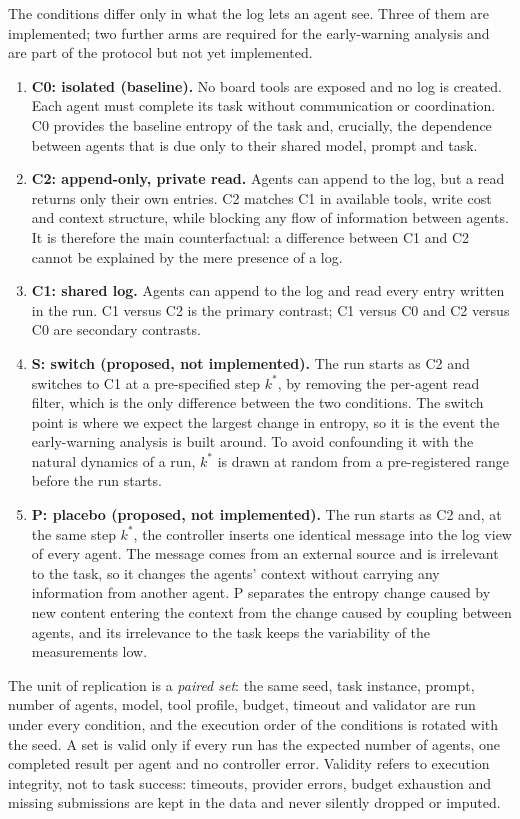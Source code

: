 The conditions differ only in what the log lets an agent see. Three of them are implemented; two further arms are required for the early-warning analysis and are part of the protocol but not yet implemented.
\begin{enumerate}
  \item \textbf{C0: isolated (baseline).} No board tools are exposed and no log is created. Each agent must complete its task without communication or coordination. C0 provides the baseline entropy of the task and, crucially, the dependence between agents that is due only to their shared model, prompt and task.
  \item \textbf{C2: append-only, private read.} Agents can append to the log, but a read returns only their own entries. C2 matches C1 in available tools, write cost and context structure, while blocking any flow of information between agents. It is therefore the main counterfactual: a difference between C1 and C2 cannot be explained by the mere presence of a log.
  \item \textbf{C1: shared log.} Agents can append to the log and read every entry written in the run. C1 versus C2 is the primary contrast; C1 versus C0 and C2 versus C0 are secondary contrasts.
  \item \textbf{S: switch (proposed, not implemented).} The run starts as C2 and switches to C1 at a pre-specified step $k^{*}$, by removing the per-agent read filter, which is the only difference between the two conditions. The switch point is where we expect the largest change in entropy, so it is the event the early-warning analysis is built around. To avoid confounding it with the natural dynamics of a run, $k^{*}$ is drawn at random from a pre-registered range before the run starts.
  \item \textbf{P: placebo (proposed, not implemented).} The run starts as C2 and, at the same step $k^{*}$, the controller inserts one identical message into the log view of every agent. The message comes from an external source and is irrelevant to the task, so it changes the agents' context without carrying any information from another agent. P separates the entropy change caused by new content entering the context from the change caused by coupling between agents, and its irrelevance to the task keeps the variability of the measurements low.
\end{enumerate}

The unit of replication is a \emph{paired set}: the same seed, task instance, prompt, number of agents, model, tool profile, budget, timeout and validator are run under every condition, and the execution order of the conditions is rotated with the seed. A set is valid only if every run has the expected number of agents, one completed result per agent and no controller error. Validity refers to execution integrity, not to task success: timeouts, provider errors, budget exhaustion and missing submissions are kept in the data and never silently dropped or imputed.

